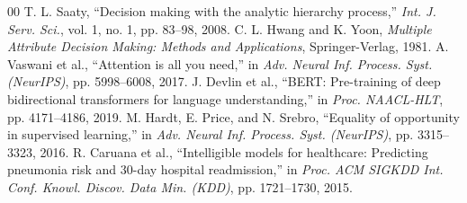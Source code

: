 \documentclass[conference]{IEEEtran}
\begin{document}
\begin{thebibliography}{00}
 T. L. Saaty, ``Decision making with the analytic hierarchy process,'' \textit{Int. J. Serv. Sci.}, vol. 1, no. 1, pp. 83--98, 2008.
 C. L. Hwang and K. Yoon, \textit{Multiple Attribute Decision Making: Methods and Applications}, Springer-Verlag, 1981.
 A. Vaswani et al., ``Attention is all you need,'' in \textit{Adv. Neural Inf. Process. Syst. (NeurIPS)}, pp. 5998--6008, 2017.
 J. Devlin et al., ``BERT: Pre-training of deep bidirectional transformers for language understanding,'' in \textit{Proc. NAACL-HLT}, pp. 4171--4186, 2019.
 M. Hardt, E. Price, and N. Srebro, ``Equality of opportunity in supervised learning,'' in \textit{Adv. Neural Inf. Process. Syst. (NeurIPS)}, pp. 3315--3323, 2016.
 R. Caruana et al., ``Intelligible models for healthcare: Predicting pneumonia risk and 30-day hospital readmission,'' in \textit{Proc. ACM SIGKDD Int. Conf. Knowl. Discov. Data Min. (KDD)}, pp. 1721--1730, 2015.
\end{thebibliography}
\end{document}
